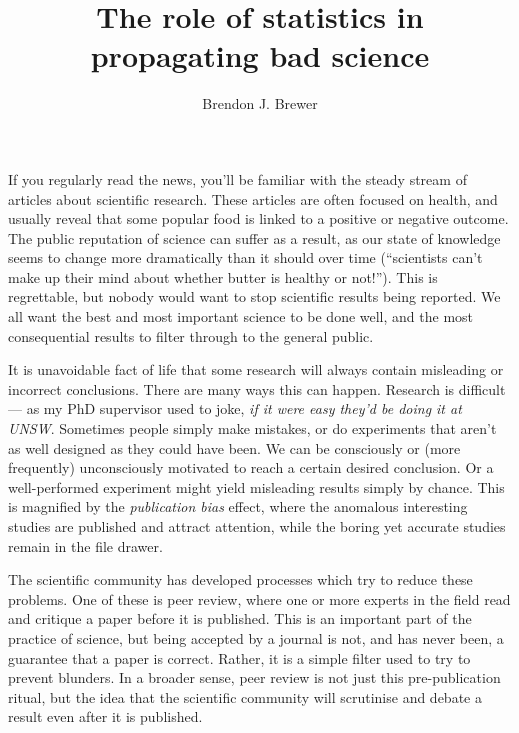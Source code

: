 \documentclass[a4paper, 12pt]{article}
\title{The role of statistics in propagating bad science}
\author{Brendon J. Brewer}
\begin{document}
\sffamily
\maketitle

If you regularly read the news, you'll be familiar with the steady stream of
articles about scientific research. These articles are often focused on
health, and usually reveal that some
popular food
is linked to a positive or negative outcome.
The public reputation of science can suffer as
a result, as our state of knowledge seems to change more dramatically
than it should
over time (``scientists can't make up their mind about whether butter is
healthy or not!''). This is regrettable,
but nobody would want to stop scientific results being reported. We all want
the best and most important science to be done well, and the most
consequential results to filter through to the general public.

It is unavoidable fact of life that some research will always
contain misleading or incorrect conclusions.
There are many ways this can happen. Research is difficult --- as my
PhD supervisor used to joke, {\em if it were easy they'd be doing it at UNSW}.
Sometimes
people simply make mistakes, or do experiments that aren't as well designed as
they could have been.
We can be consciously or (more frequently)
unconsciously motivated to reach a certain desired conclusion.
Or a well-performed experiment might yield
misleading results simply by chance. This is magnified by the
{\em publication bias} effect, where the anomalous interesting studies
are published and attract attention, while the boring yet accurate studies
remain in the file drawer.

The scientific community has developed processes which try to reduce these
problems. One of these is peer review, where one or more experts in the field
read and critique a paper before it is published.
This is an important part of the practice of
science, but being accepted by a journal
is not, and has never been, a guarantee that a paper is correct. Rather, it
is a simple filter used to try to prevent blunders.
In a broader sense, peer review is not just this pre-publication ritual, but
the idea that the scientific community will scrutinise and debate a result
even after it is published.
\end{document}
